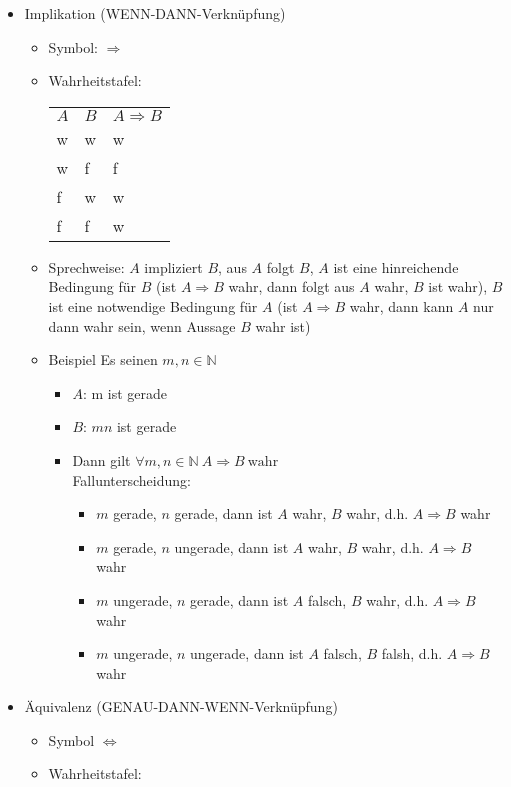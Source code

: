 \documentclass[11pt]{article}
\DeclareMathOperator{\Forall}{\forall}
\begin{document}
\begin{itemize}
\item Implikation (WENN-DANN-Verknüpfung)
\begin{itemize}
\item Symbol: $\Rightarrow$
\item Wahrheitstafel:
\begin{center}
\begin{tabular}{lll}
$A$ & $B$ & $A\Rightarrow B$\\
w & w & w\\
w & f & f\\
f & w & w\\
f & f & w\\
\end{tabular}
\end{center}
\item Sprechweise: $A$ impliziert $B$, aus $A$ folgt $B$, $A$ ist eine hinreichende Bedingung für $B$ (ist $A\Rightarrow B$ wahr, dann folgt aus $A$ wahr, $B$ ist wahr), $B$ ist eine notwendige Bedingung für $A$ (ist $A\Rightarrow B$ wahr, dann kann $A$ nur dann wahr sein, wenn Aussage $B$ wahr ist)
\item Beispiel Es seinen $m,n\in\mathbb{N}$
\begin{itemize}
\item $A$: m ist gerade
\item $B$: $mn$ ist gerade
\item Dann gilt $\Forall m,n \in\mathbb{N}~A\Rightarrow B~\text{wahr}$ \\
         Fallunterscheidung:
\begin{itemize}
\item $m$ gerade, $n$ gerade, dann ist $A$ wahr, $B$ wahr, d.h. $A\Rightarrow B$ wahr
\item $m$ gerade, $n$ ungerade, dann ist $A$ wahr, $B$ wahr, d.h. $A\Rightarrow B$ wahr
\item $m$ ungerade, $n$ gerade, dann ist $A$ falsch, $B$ wahr, d.h. $A\Rightarrow B$ wahr
\item $m$ ungerade, $n$ ungerade, dann ist $A$ falsch, $B$ falsh, d.h. $A\Rightarrow B$ wahr
\end{itemize}
\end{itemize}
\end{itemize}
\item Äquivalenz (GENAU-DANN-WENN-Verknüpfung)
\begin{itemize}
\item Symbol $\Leftrightarrow$
\item Wahrheitstafel:
\begin{center}

\end{center}
\end{itemize}
\end{itemize}
\end{document}
